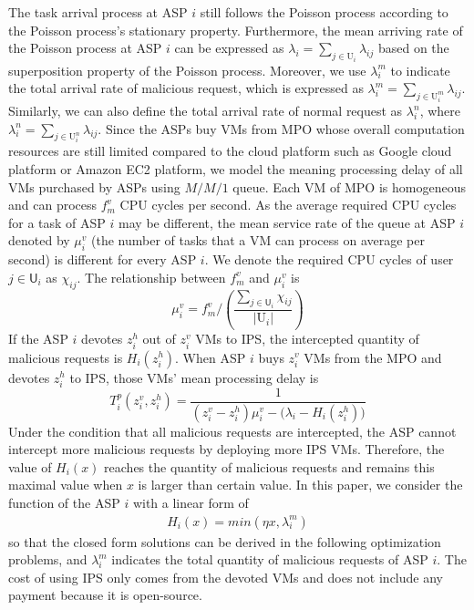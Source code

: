 \documentclass[conference]{IEEEtran}
\begin{document}
The task arrival process at ASP $i$ still follows the Poisson process according to the Poisson process's stationary property. Furthermore, the mean arriving rate of the Poisson process at ASP $i$ can be expressed as $\lambda_i = \sum_{j \in \mathrm{U}_i} \lambda_{ij}$ based on the superposition property of the Poisson process. Moreover, we use $\lambda_i^m$ to indicate the total arrival rate of malicious request, which is expressed as $\lambda_i^m = \sum_{j \in \mathrm{U}_i^m} \lambda_{ij}$. Similarly, we can also define the total arrival rate of normal request as $\lambda_i^n$, where $\lambda_i^n =  \sum_{j \in \mathrm{U}_i^n} \lambda_{ij}$. Since the ASPs buy VMs from MPO whose overall computation resources are still limited compared to the cloud platform such as Google cloud platform or Amazon EC2 platform, we model the meaning processing delay of all VMs purchased by ASPs using $M/M/1$ queue. Each VM of MPO is homogeneous and can process $f_m^v$ CPU cycles per second. As the average required CPU cycles for a task of ASP $i$ may be different, the mean service rate of the queue at ASP $i$ denoted by $\mu_i^v$ (the number of tasks that a VM can process on average per second) is different for every ASP $i$. We denote the required CPU cycles of user $j \in \mathsf{U}_i$ as $\chi_{ij}$. The relationship between $f_m^v$ and $\mu_i^v$ is
\begin{equation}\label{eqn:service_rate}
\mu_i^v = f_m^v/(\frac{\sum_{j \in \mathsf{U}_i} \chi_{ij}}{|\mathrm{U}_i|})
\end{equation}
If the ASP $i$ devotes $z_i^h$ out of $z_i^v$ VMs to IPS, the intercepted quantity of malicious requests is $H_i(z_i^h)$. When ASP $i$ buys $z_i^v$ VMs from the MPO and devotes $z_i^h$ to IPS, those VMs' mean processing delay is
\begin{equation} \label{eqn:asp_mm1_delay}
T_i^p(z_i^v, z_i^h) = \frac{1}{(z_i^v - z_i^h)\mu_i^v - \big(\lambda_i - H_i(z_i^h)\big)}
\end{equation}
Under the condition that all malicious requests are intercepted, the ASP cannot intercept more malicious requests by deploying more IPS VMs. Therefore, the value of $H_i(x)$ reaches the quantity of malicious requests and remains this maximal value when $x$ is larger than certain value. In this paper, we consider the function of the ASP $i$ with a linear form of
\begin{equation}
\begin{aligned}
    H_i(x) = min(\eta{x}, \lambda_i^m)
\end{aligned}
\end{equation}
so that the closed form solutions can be derived in the following optimization problems, and $\lambda_i^m$ indicates the total quantity of malicious requests of ASP $i$. The cost of using IPS only comes from the devoted VMs and does not include any payment because it is open-source.
\end{document}

